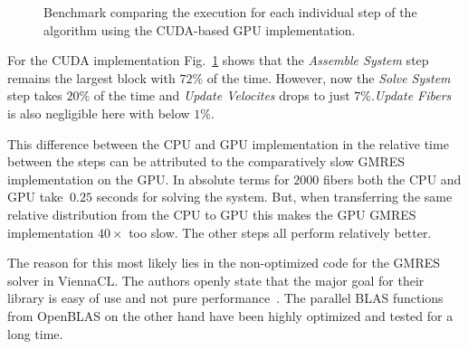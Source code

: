 \begin{figure}[!htbp]
  \centering
  \caption[Benchmark individual steps on GPU.]{Benchmark comparing the execution for each individual step of the algorithm using the CUDA-based GPU implementation.}
  \label{fig:bench_cuda_steps}
\end{figure}

For the CUDA implementation Fig.~\ref{fig:bench_cuda_steps} shows that the \emph{Assemble System} step remains the largest block with $72\%$ of the time. However, now the \emph{Solve System} step takes $20\%$ of the time and \emph{Update Velocites} drops to just $7\%$.\emph{Update Fibers} is also negligible here with below $1\%$.

This difference between the CPU and GPU implementation in the relative time between the steps can be attributed to the comparatively slow GMRES implementation on the GPU. In absolute terms for $2000$ fibers both the CPU and GPU take $~0.25$ seconds for solving the system. But, when transferring the same relative distribution from the CPU to GPU this makes the GPU GMRES implementation $40×$ too slow. The other steps all perform relatively better.

The reason for this most likely lies in the non-optimized code for the GMRES solver in ViennaCL. The authors openly state that the major goal for their library is easy of use and not pure performance~\cite{ViennaCLRupp2010}. The parallel BLAS functions from OpenBLAS on the other hand have been highly optimized and tested for a long time.

